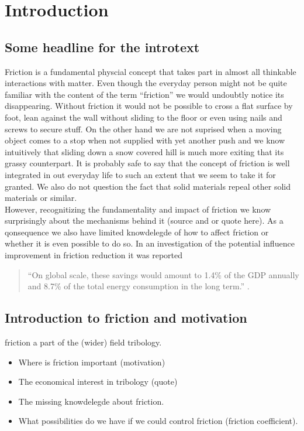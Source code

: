 \chapter*{Introduction}

\section{Some headline for the introtext}


Friction is a fundamental physcial concept that takes part in almost all thinkable interactions with matter. Even though the everyday person might not be quite familiar with the content of the term ``friction'' we would undoubtly notice its disappearing. Without friction it would not be possible to cross a flat surface by foot, lean against the wall without sliding to the floor or even using nails and screws to secure stuff. On the other hand we are not suprised when a moving object comes to a stop when not supplied with yet another push and we know intuitively that sliding down a snow covered hill is much more exiting that its grassy counterpart. It is probably safe to say that the concept of friction is well integrated in out everyday life to such an extent that we seem to take it for granted. We also do not question the fact that solid materials repeal other solid materials or similar. \\
However, recognitizing the fundamentality and impact of friction we know surprisingly about the mechanisms behind it (source and or quote here). As a qonsequence we also have limited knowdelegde of how to affect friction or whether it is even possible to do so. In an investigation of the potential influence improvement in friction reduction it was reported


\begin{quote}
    ``On global scale, these savings would amount to 1.4\% of the GDP annually and 8.7\% of the total energy consumption in the long term.'' \cite{holmberg_influence_2017}. 
\end{quote}





\section{Introduction to friction and motivation}
friction a part of the (wider) field tribology.

\begin{itemize}
    \item Where is friction important (motivation)
    \item The economical interest in tribology (quote)
    \item The missing knowdelegde about friction.
    \item What possibilities do we have if we could control friction (friction coefficient).
\end{itemize}


